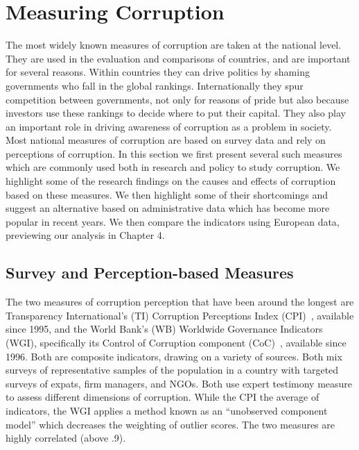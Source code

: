 \section{Measuring Corruption}
The most widely known measures of corruption are taken at the national level. They are used in the evaluation and comparisons of countries, and are important for several reasons. Within countries they can drive politics by shaming governments who fall in the global rankings. Internationally they spur competition between governments, not only for reasons of pride but also because investors use these rankings to decide where to put their capital. They also play an important role in driving awareness of corruption as a problem in society. Most national measures of corruption are based on survey data and rely on perceptions of corruption. In this section we first present several such measures which are commonly used both in research and policy to study corruption. We highlight some of the research findings on the causes and effects of corruption based on these measures. We then highlight some of their shortcomings and suggest an alternative based on administrative data which has become more popular in recent years. We then compare the indicators using European data, previewing our analysis in Chapter 4.


\subsection{Survey and Perception-based Measures}
The two measures of corruption perception that have been around the longest are Transparency International's (TI) Corruption Perceptions Index (CPI)~\cite{TI_CPI, lambsdorff20032002}, available since 1995, and the World Bank's (WB) Worldwide Governance Indicators (WGI), specifically its Control of Corruption component (CoC)~\cite{WB_WGI,kaufmann2005governance}, available since 1996. Both are composite indicators, drawing on a variety of sources. Both mix surveys of representative samples of the population in a country with targeted surveys of expats, firm managers, and NGOs. Both use expert testimony measure to assess different dimensions of corruption. While the CPI the average of indicators, the WGI applies a method known as an ``unobserved component model'' which decreases the weighting of outlier scores. The two measures are highly correlated (above .9).

